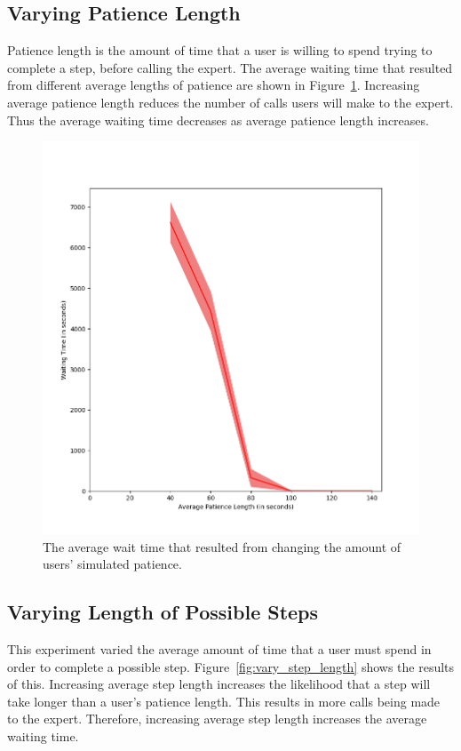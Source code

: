 \subsection{Varying Patience Length}

Patience length is the amount of time that a user is willing to spend trying to
complete a step, before calling the expert.
The average waiting time that resulted from different average lengths of
patience are shown in Figure~\ref{fig:vary_patience}.
Increasing average patience length reduces the number of calls users will make
to the expert.
Thus the average waiting time decreases as average patience length increases.

\begin{figure}[H]
  \includegraphics[width=\textwidth]{figures/montecarlo/vary_patience.png}
  \caption{
    The average wait time that resulted from changing the amount of users'
    simulated patience.
  }\label{fig:vary_patience}
\end{figure}

\subsection{Varying Length of Possible Steps}

This experiment varied the average amount of time that a user must spend in
order to complete a possible step.
Figure~\ref{fig:vary_step_length} shows the results of this.
Increasing average step length increases the likelihood that a step will take
longer than a user's patience length.
This results in more calls being made to the expert.
Therefore, increasing average step length increases the average waiting time.

